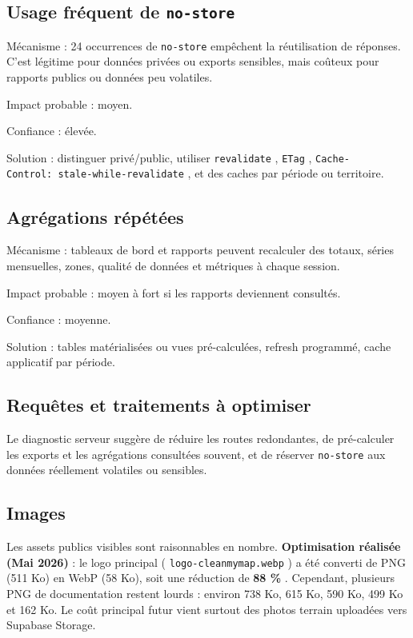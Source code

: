 \documentclass[
  10pt,
  a4paper,
  DIV=11,
  numbers=noendperiod,
  oneside]{scrreprt}
\let\oldtextbf\textbf
\renewcommand{\textbf}[1]{\oldtextbf{\textcolor{cmmnavy}{#1}}}
\begin{document}
\subsection{\texorpdfstring{Usage fréquent de
\texttt{no-store}}{Usage fréquent de no-store}}\label{usage-fruxe9quent-de-no-store}

Mécanisme : 24 occurrences de \texttt{no-store} empêchent la
réutilisation de réponses. C'est légitime pour données privées ou
exports sensibles, mais coûteux pour rapports publics ou données peu
volatiles.

Impact probable : moyen.

Confiance : élevée.

Solution : distinguer privé/public, utiliser \texttt{revalidate} ,
\texttt{ETag} , \texttt{Cache-Control:\ stale-while-revalidate} , et des
caches par période ou territoire.

\subsection{Agrégations
répétées}\label{agruxe9gations-ruxe9puxe9tuxe9es}

Mécanisme : tableaux de bord et rapports peuvent recalculer des totaux,
séries mensuelles, zones, qualité de données et métriques à chaque
session.

Impact probable : moyen à fort si les rapports deviennent consultés.

Confiance : moyenne.

Solution : tables matérialisées ou vues pré-calculées, refresh
programmé, cache applicatif par période.

\subsection{Requêtes et traitements à
optimiser}\label{requuxeates-et-traitements-uxe0-optimiser}

Le diagnostic serveur suggère de réduire les routes redondantes, de
pré-calculer les exports et les agrégations consultées souvent, et de
réserver \texttt{no-store} aux données réellement volatiles ou
sensibles.

\subsection{Images}\label{images}

Les assets publics visibles sont raisonnables en nombre.
\textbf{Optimisation réalisée (Mai 2026)} : le logo principal (
\texttt{logo-cleanmymap.webp} ) a été converti de PNG (511 Ko) en WebP
(58 Ko), soit une réduction de \textbf{88 \%} . Cependant, plusieurs PNG
de documentation restent lourds : environ 738 Ko, 615 Ko, 590 Ko, 499 Ko
et 162 Ko. Le coût principal futur vient surtout des photos terrain
uploadées vers Supabase Storage.
\end{document}
